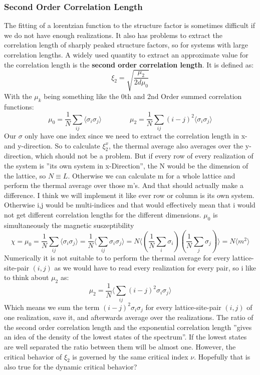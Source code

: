	\subsubsection{Second Order Correlation Length}
	The fitting of a lorentzian function to the structure factor is sometimes difficult if we do not have enough realizations. It also has problems to extract the correlation length of sharply peaked structure factors, so for systems with large correlation lengths. A widely used quantity to extract an approximate value for the correlation length is the \textbf{second order correlation length}. It is defined as:
	\begin{equation}
		\xi_2 =	\sqrt{\frac{\mu_2}{2 d \mu_0}}
	\end{equation}
	With the $\mu_k$ being something like the 0th and 2nd Order summed correlation functions:
	\begin{equation}
		\mu_0 =	\frac{1}{N} \sum_{ij}^{} \langle \sigma_i \sigma_j \rangle \qquad \qquad \mu_2 =	\frac{1}{N} \sum_{ij}^{} (i-j)^2 \langle \sigma_i \sigma_j \rangle
	\end{equation}
	Our $\sigma$ only have one index since we need to extract the correlation length in x- and y-direction. So to calculate $\xi^x_2$, the thermal average also averages over the y-direction, which should not be a problem. But if every row of every realization of the system is ''its own system in x-Direction'', the N would be the dimension of the lattice, so $N \equiv L$. Otherwise we can calculate m for a whole lattice and perform the thermal average over those m's. And that should actually make a difference. I think we will implement it like ever row or column is its own system. Otherwise i,j would be multi-indices and that would effectively mean that i would not get different correlation lengths for the different dimensions.
	$\mu_0$ is simultaneously the magnetic suszeptibility
	\begin{equation*}
		\chi =	\mu_0 =	\frac{1}{N} \sum_{ij}^{} \langle \sigma_i \sigma_j \rangle =	\frac{1}{N} \Big \langle \sum_{ij}^{}  \sigma_i \sigma_j \Big \rangle =	{N} \Bigg \langle \left( \frac{1}{N} \sum_{i}^{}  \sigma_i \right) \left( \frac{1}{N} \sum_{j}^{} \sigma_j \right) \Bigg \rangle =	N	\langle m^2 \rangle
	\end{equation*}
	Numerically it is not suitable to to perform the thermal average for every lattice-site-pair $(i,j)$ as we would have to read every realization for every pair, so i like to think about $\mu_2$ as:
	\begin{equation}
		\mu_2 =	\frac{1}{N}  \Big \langle  \sum_{ij}^{} (i-j)^2 \sigma_i \sigma_j  \Big \rangle
	\end{equation}
	Which means we sum the term $(i-j)^2 \sigma_i \sigma_j$ for every lattice-site-pair $(i,j)$ of one realization, save it, and afterwards average over the realizations.
	The ratio of the second order correlation length and the exponential correlation length ''gives an idea of the density of the lowest states of the spectrum''. If the lowest states are well separated the ratio between them will be almost one.
	However, the critical behavior of $\xi_2$ is governed by the same critical index $\nu$. Hopefully that is also true for the dynamic critical behavior?
